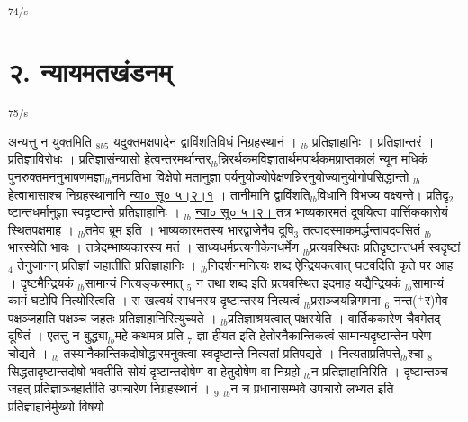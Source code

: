 \documentclass[article,12pt,a4paper]{memoir}%
\newcommand{\add}[1]{($^{+}$#1)}
\begin{document}
	  \textsuperscript{\textenglish{74/s}}
	  
	
	    
	    \beginnumbering%
	    
	  
\chapter[{२. न्यायमतखंडनम्}][{२. न्यायमतखंडनम्}]{२. न्यायमतखंडनम्}\textsuperscript{\textenglish{75/s}}

	  
	  \pstart \leavevmode%
	अन्यत्तु न युक्तमिति {\tiny $_{8b5}$} यदुक्तमक्षपादेन द्वाविंशतिविधं निग्रहस्थानं । {\tiny $_{lb}$} प्रतिज्ञाहानिः । प्रतिज्ञान्तरं । प्रतिज्ञाविरोधः । प्रतिज्ञासंन्यासो हेत्वन्तरमर्थान्तर{\tiny $_{lb}$}न्निरर्थकमविज्ञातार्थमपार्थकमप्राप्तकालं न्यून मधिकं पुनरुक्तमननुभाषणमज्ञा{\tiny $_{lb}$}नमप्रतिभा विक्षेपो मतानुज्ञा पर्यनुयोज्योपेक्षणन्निरनुयोज्यानुयोगोपसिद्धान्तो {\tiny $_{lb}$}हेत्वाभासाश्च निग्रहस्थानानि \href{http://sarit.indology.info/?cref=ns\%C5\%AB.5.2.1}{न्या० सू० ५।२।१} । तानीमानि द्वाविंशति{\tiny $_{lb}$}विधानि विभज्य वक्ष्यन्ते। प्रतिदृ{\tiny $_{2}$}ष्टान्तधर्मानुज्ञा स्वदृष्टान्ते प्रतिज्ञाहानिः । {\tiny $_{lb}$} \href{http://sarit.indology.info/?cref=ns\%C5\%AB.5.2.}{न्या० सू० ५।२। } तत्र भाष्यकारमतं दूषयित्वा वार्त्तिककारोयं स्थितपक्षमाह । {\tiny $_{lb}$}तमेव ब्रूम इति । भाष्यकारमतस्य {\color{DodgerBlue3}भारद्वाजे}नैव दूषि{\tiny $_{3}$} तत्वादस्माकमर्द्धन्तावदवसितं {\tiny $_{lb}$}भारस्येति भावः । तत्रेदम्भाष्यकारस्य मतं । साध्यधर्मप्रत्यनीकेनधर्मेण {\tiny $_{lb}$}प्रत्यवस्थितः प्रतिदृष्टान्तधर्म स्वदृष्टां {\tiny $_{4}$} तेनुजानन् प्रतिज्ञां जहातीति प्रतिज्ञाहानिः । {\tiny $_{lb}$}निदर्शनमनित्यः शब्द ऐन्द्रियकत्वात् घटवदिति कृते पर आह । दृष्टमैन्द्रियकं {\tiny $_{lb}$}सामान्यं नित्यङ्कस्मात् {\tiny $_{5}$} न तथा शब्द इति प्रत्यवस्थित इदमाह यद्यैन्द्रियकं {\tiny $_{lb}$}सामान्यं कामं घटोपि नित्योस्त्विति । स खल्वयं साधनस्य दृष्टान्तस्य नित्यत्वं {\tiny $_{lb}$}प्रसञ्जयन्निगमना {\tiny $_{6}$} नन्त\add{र}मेव पक्षञ्जहाति पक्षञ्च जहतः प्रतिज्ञाहानिरित्युच्यते । {\tiny $_{lb}$}प्रतिज्ञाश्रयत्वात् पक्षस्येति । {\color{DodgerBlue3}वार्तिककारेण} चैवमेतद् दूषितं । एतत्तु न बुद्ध्या{\tiny $_{lb}$}महे कथमत्र प्रति {\tiny $_{7}$} ज्ञा हीयत इति हेतोरनैकान्तिकत्वं सामान्यदृष्टान्तेन परेण चोद्यते । {\tiny $_{lb}$} \leavevmode{} तस्यानैकान्तिकदोषोद्धारमनुक्त्वा स्वदृष्टान्ते नित्यतां प्रतिपद्यते । नित्यताप्रतिपत्ते{\tiny $_{lb}$}श्चा {\tiny $_{8}$} सिद्धतादृष्टान्तदोषो भवतीति सोयं दृष्टान्तदोषेण वा हेतुदोषेण वा निग्रहो {\tiny $_{lb}$}न प्रतिज्ञाहानिरिति । दृष्टान्तञ्च जहत् प्रतिज्ञाञ्जहातीति उपचारेण निग्रहस्थानं । {\tiny $_{9}$} \leavevmode{} {\tiny $_{lb}$}न च प्रधानासम्भवे उपचारो लभ्यत इति प्रतिज्ञाहानेर्मुख्यो विषयो 
\end{document}

